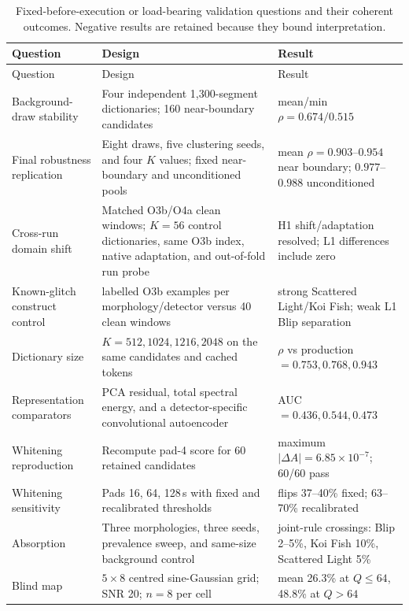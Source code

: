 \documentclass[12pt]{article}
\begin{document}
\begin{longtable}{@{}
  >{\raggedright\arraybackslash}p{}
  >{\raggedright\arraybackslash}p{}
  >{\raggedright\arraybackslash}p{}
  @{}}
\caption{Fixed-before-execution or load-bearing validation questions and their coherent
outcomes.  Negative results are retained because they bound interpretation.}
\label{tab:validation}\\
\toprule
Question & Design & Result \\
\midrule
\endfirsthead
\toprule
Question & Design & Result \\
\midrule
\endhead
Background-draw stability & Four independent 1,300-segment dictionaries; 160
near-boundary candidates & mean/min $\rho=0.674/0.515$ \\
Final robustness replication & Eight draws, five clustering seeds, and four
$K$ values; fixed near-boundary and unconditioned pools & mean $\rho=0.903$--$0.954$
near boundary; $0.977$--$0.988$ unconditioned \\
Cross-run domain shift & Matched O3b/O4a clean windows; $K=56$ control
dictionaries, same O3b index, native adaptation, and out-of-fold run probe & H1 shift/adaptation resolved; L1
differences include zero \\
Known-glitch construct control & 30 labelled O3b examples per
morphology/detector versus 40 clean windows & strong Scattered Light/Koi Fish;
weak L1 Blip separation \\
Dictionary size & $K=512,1024,1216,2048$ on the same candidates and cached
tokens & $\rho$ vs production $=0.753,0.768,0.943$ \\
Representation comparators & PCA residual, total spectral energy, and a
detector-specific convolutional autoencoder & AUC $=0.436,0.544,0.473$ \\
Whitening reproduction & Recompute pad-4 score for 60 retained candidates &
maximum $|\Delta A|=6.85\times10^{-7}$; 60/60 pass \\
Whitening sensitivity & Pads 16, 64, 128\,s with fixed and recalibrated
thresholds & flips 37--40\% fixed; 63--70\% recalibrated \\
Absorption & Three morphologies, three seeds, prevalence sweep, and same-size
background control & joint-rule crossings: Blip 2--5\%, Koi Fish 10\%,
Scattered Light 5\% \\
Blind map & $5\times8$ centred sine-Gaussian grid; SNR 20; $n=8$ per cell &
mean 26.3\% at $Q\le64$, 48.8\% at $Q>64$ \\

\end{longtable}
\end{document}
